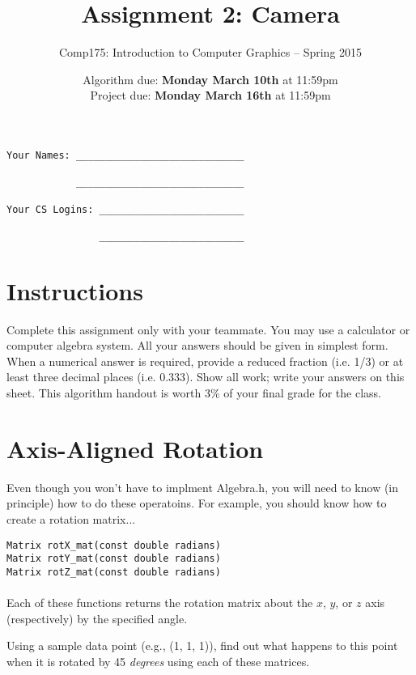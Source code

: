 \documentclass[10pt,twocolumn]{article}
\title{\Huge{\bf Assignment 2: Camera}}
\author{Comp175: Introduction to Computer Graphics -- Spring 2015}
\date{Algorithm due:  {\bf Monday March 10th} at 11:59pm\\
Project due:  {\bf Monday March 16th} at 11:59pm}
\begin{document}
\maketitle

\begin{verbatim}
Your Names: _____________________________

            _____________________________

Your CS Logins: _________________________

                _________________________
\end{verbatim}

\section{Instructions}
Complete this assignment only with your teammate. You may use a
calculator or computer algebra system. All your answers should be given in simplest form.
When a numerical answer is required, provide a reduced fraction (i.e. 1/3) or at least three
decimal places (i.e. 0.333). Show all work; write your answers on this sheet. This algorithm handout is worth 3\% of your final grade for the class.

\vspace{-0.4cm}
\section{Axis-Aligned Rotation}

Even though you won't have to implment Algebra.h, you will need to know (in principle) how to do these operatoins. For example, you should know how to create a rotation matrix...

{\tt Matrix rotX\_mat(const double radians)}\\
{\tt Matrix rotY\_mat(const double radians)}\\
{\tt Matrix rotZ\_mat(const double radians)}\\\\
Each of these functions returns the rotation matrix about the $x$, $y$, or $z$ axis (respectively) by the specified angle.
\begin{framed}
\noindent {\bf [1 point]} Using a sample data point (e.g., (1, 1, 1)), find out what happens to this point when it is rotated by 45 \emph{degrees} using each of these matrices.
\end{framed}
\end{document}
